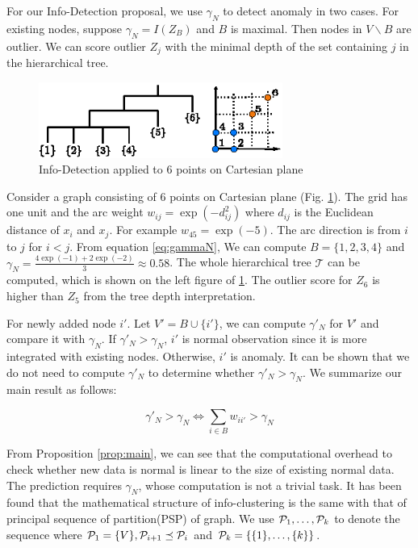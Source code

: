 \documentclass[runningheads]{llncs}
\begin{document}
For our Info-Detection proposal, we use $\gamma_N$ to detect anomaly in two cases. For existing nodes, suppose $\gamma_N=I(Z_B)$ and $B$ is maximal. Then nodes in $V\backslash B$  are outlier. We can score outlier $Z_j$ with the minimal depth of the set containing $j$ in the hierarchical tree. 
\begin{example}
	\begin{figure}[!ht]
		\centering
		\includegraphics[width=8cm]{pic/outlier_example.eps}
		\caption{Info-Detection applied to 6 points on Cartesian plane}\label{fig:ex}
	\end{figure}
	Consider a graph consisting of 6 points on Cartesian plane (Fig. \ref{fig:ex}). The grid has one unit and the arc weight $w_{ij} = \exp(-d_{ij}^2)$ where $d_{ij}$ is the Euclidean distance of $x_i$ and $x_j$. For example $w_{45} = \exp(-5)$. The arc direction is from $i$ to $j$ for $i<j$. From equation \eqref{eq:gammaN}, We can compute $B=\{1,2,3,4\}$ and $\gamma_N = \frac{4\exp(-1)+2\exp(-2)}{3}\approx 0.58$. The whole hierarchical tree $\mathcal{T}$ can be computed, which is shown on the left figure of \ref{fig:ex}. The outlier score for $Z_6$ is higher than $Z_5$ from the tree depth interpretation.
\end{example}
For newly added node $i'$. Let $V'=B\cup \{i'\}$, we can compute $\gamma'_N$ for $V'$ and compare it with $\gamma_N$. If $\gamma'_N>\gamma_N$, $i'$ is normal observation since it is more integrated with existing nodes. Otherwise, $i'$ is anomaly. It can be shown that we do not need to compute $\gamma'_N$ to determine whether $\gamma'_N>\gamma_N$. We summarize our main result as follows:
\begin{proposition}\label{prop:main}
\begin{equation}
\gamma'_N > \gamma_N \iff  \sum_{i \in B} w_{ii'} > \gamma_N 
\end{equation}
\end{proposition}
From Proposition \ref{prop:main}, we can see that the computational overhead to check whether new data is normal is linear to the size of existing normal data. 
The prediction requires $\gamma_N$, whose computation is not a trivial task. It has been found that the mathematical structure of info-clustering is the same with that of principal sequence of partition(PSP) of graph. We use $\P_1, \dots, \P_k$ to denote the sequence where $\P_1 = \{V\}, \P_{i+1} \preceq \P_i$ and $\P_k = \{\{1\},\dots,\{k\}\}$.
\end{document}
